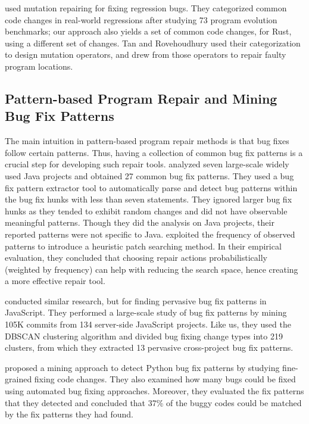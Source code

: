 \cite{tan2015relifix} used mutation repairing for fixing regression bugs. They categorized common code changes in real-world regressions after studying 73 program evolution benchmarks; our approach also yields a set of common code changes, for Rust, using a different set of changes. Tan and Rovehoudhury used their categorization to design mutation operators, and drew from those operators to repair faulty program locations.

\subsection{Pattern-based Program Repair and Mining Bug Fix Patterns}

The main intuition in pattern-based program repair methods is that bug fixes follow certain patterns. Thus, having a collection of common bug fix patterns is a crucial step for developing such repair tools. \cite{pan2009toward} analyzed seven large-scale widely used Java projects and obtained 27 common bug fix patterns. They used a bug fix pattern extractor tool to automatically parse and detect bug patterns within the bug fix hunks with less than seven statements. They ignored larger bug fix hunks as they tended to exhibit random changes and did not have observable meaningful patterns. Though they did the analysis on Java projects, their reported patterns were not specific to Java. \cite{martinez2015mining,martinez2012mining} exploited the frequency of observed patterns to introduce a heuristic patch searching method. In their empirical evaluation, they concluded that choosing repair actions probabilistically (weighted by frequency) can help with reducing the search space, hence creating a more effective repair tool.

\cite{hanam2016discovering} conducted similar research, but for finding pervasive bug fix patterns in JavaScript. They performed a large-scale study of bug fix patterns by mining 105K commits from 134 server-side JavaScript projects. Like us, they used the DBSCAN clustering algorithm and divided bug fixing change types into 219 clusters, from which they extracted 13 pervasive cross-project bug fix patterns. 

\cite{yang2022mining} proposed a mining approach to detect Python bug fix patterns by studying fine-grained fixing code changes. They also examined how many bugs could be fixed using automated bug fixing approaches. Moreover, they evaluated the fix patterns that they detected and concluded that 37\% of the buggy codes could be matched by the fix patterns they had found. 

